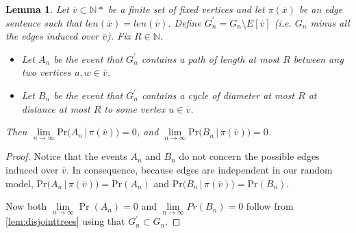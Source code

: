 \documentclass[12pt,notitlepage,a4paper]{article}
\newtheorem{lemma}{Lemma}[section]
\theoremstyle{definition}
\newcommand{\N}{\mathbb{N}}
\newcommand{\Ln}{\lim\limits_{n\to \infty}}
\begin{document}
\begin{lemma}\label{lem:far_away}
	Let $\overline{v} \subset \N*$ be a finite set of fixed vertices and let 
	$\pi(\overline{x})$ be an edge sentence such that
	$len(\overline{x})=len(\overline{v})$. 
	Define $G_n^\prime=G_n \setminus E[\overline{v}]$ (i.e. $G_n$ minus all the
	edges induced over $\overline{v}$). Fix $R\in \N$. 
	\begin{itemize}
		\item Let $A_n$ be the event that $G^\prime_n$ contains a path of 
		length	at most	$R$ between any two vertices $u,w\in \overline{v}$.
		\item Let $B_n$ be the event
		that $G^\prime_n$ contains a cycle of diameter at most $R$
		at distance at most $R$ to some vertex $u\in \overline{v}$.
	\end{itemize}
	Then $\Ln \mathrm{Pr}\big(A_n \, | \, \pi(\overline{v})\big)=0$, and 
	$\Ln \mathrm{Pr}\big(B_n \, | \, \pi(\overline{v})\big)=0$. 
\end{lemma}
\begin{proof}
	Notice that the events $A_n$ and $B_n$ do not concern the possible edges
	induced over $\overline{v}$. In consequence, because edges are independent
	in our random model, 
	$\mathrm{Pr}\big(A_n \, | \, \pi(\overline{v})\big)
	=\mathrm{Pr}(A_n)$ and 
	$\mathrm{Pr}\big(B_n \, | \, \pi(\overline{v})\big)
	=\mathrm{Pr}(B_n)$.\par
	Now both $\Ln \Pr(A_n)=0$ and $\Ln Pr(B_n)=0$ follow from 
	\cref{lem:disjointtrees} using that $G^\prime_n\subset G_n$.  
\end{proof}
\end{document}
